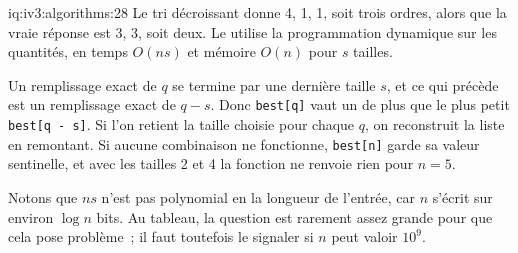\begin{solution}{iq:iv3:algorithms:28}
Le tri décroissant donne 4, 1, 1, soit trois ordres, alors que la vraie réponse est 3, 3, soit deux. Le  utilise la programmation dynamique sur les quantités, en temps $O(ns)$ et mémoire $O(n)$ pour $s$ tailles.
\label{lst:iv3:al:clips}

Un remplissage exact de $q$ se termine par une dernière taille $s$, et ce qui précède est un remplissage exact de $q - s$. Donc \texttt{best[q]} vaut un de plus que le plus petit \texttt{best[q - s]}. Si l'on retient la taille choisie pour chaque $q$, on reconstruit la liste en remontant. Si aucune combinaison ne fonctionne, \texttt{best[n]} garde sa valeur sentinelle, et avec les tailles 2 et 4 la fonction ne renvoie rien pour $n = 5$.

Notons que $ns$ n'est pas polynomial en la longueur de l'entrée, car $n$ s'écrit sur environ $\log n$ bits. Au tableau, la question est rarement assez grande pour que cela pose problème~; il faut toutefois le signaler si $n$ peut valoir $10^9$.

\end{solution}

